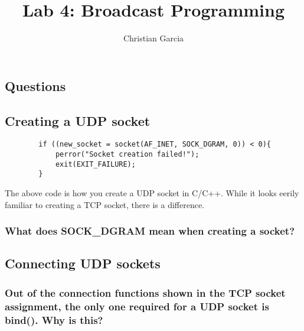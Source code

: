 \documentclass{article}
\title{Lab 4: Broadcast Programming}
\author{Christian Garcia}
\begin{document}
	\maketitle
	
	
	\begin{Huge}
		\section{Questions}
	\end{Huge}
	
	\begin{Large}
		\subsection{\textbf{Creating a UDP socket}}
	\end{Large}
	
	\begin{lstlisting}
		if ((new_socket = socket(AF_INET, SOCK_DGRAM, 0)) < 0){
			perror("Socket creation failed!");
			exit(EXIT_FAILURE);
		}	
	\end{lstlisting}
	
	The above code is how you create a UDP socket in C/C++. While it looks eerily familiar to creating a TCP socket, there is a difference. 
	
	\subsubsection{What does SOCK\_DGRAM mean when creating a socket?}
	\vspace{72pt}
	
	
	\begin{Large}
		\subsection{\textbf{Connecting UDP sockets}}
	\end{Large}
	
	\subsubsection{Out of the connection functions shown in the TCP socket assignment, the only one required for a UDP socket is bind(). Why is this?}
	\vspace{72pt}
	\pagebreak
	
\end{document}

